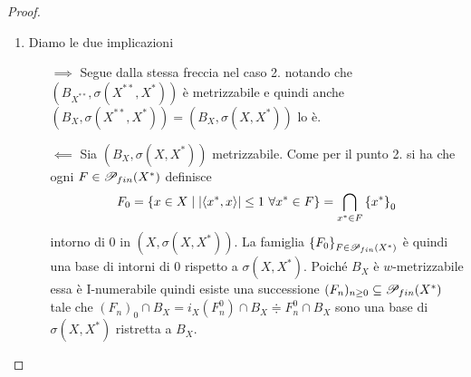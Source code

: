 \begin{proof}
\begin{enumerate}
\begin{itemize}
	Se $(B_{X^\ast},\sigma(X^\ast,X))$ \`e metrizzabile allora in particolare \`e I-numerabile, quindi esiste una successione $(F_n)_{n\geq 0}\subseteq \Ps_{fin}(X)$ tale che $(F_n^0\cap B_{X^\ast})_{n\geq 0}$ \`e una base di intorni di $0$. Notiamo in particolare che $\bigcap_{n\geq 0}F_n^0\cap B_{X^\ast}=(0)$.

	Senza perdita di generalit\`a supponiamo anche $F_{n+1}\supseteq 2F_n$ (se avevamo una successione valida basta aggiungere la riscalatura del termine prima e l'insieme resta finito). Ricordiamo che se $A\subseteq B$ allora $B^0\subseteq A^0$, quindi gli intorni che prendiamo diventano inscatolati.
	\begin{align*}
		(0)=&\bigcap_{n\geq 0}(F_n^0\cap B_{X^\ast})=\pa{\bigcap_{n\geq 0}F_n^0}\cap B_{X^\ast}=\pa{\bigcup_{n\geq 0} F_n}^0\cap B_{X^\ast}=\\
		=&\pa{\assco\pa{\bigcup_{n\geq 0} F_n}}^0\cap B_{X^\ast}\overset{(\star)}=\pa{\Span\pa{\bigcup_{n\geq 0}F_n}}^0\cap B_{X^\ast}=\\
		=&\pa{\Span\pa{\bigcup_{n\geq0}F_n}}^\perp\cap B_{X^\ast}
	\end{align*}
	dove l'uguaglianza $(\star)$ vale perch\'e per ipotesi $2\bigcup F_n\subseteq \bigcup F_n$, quindi prendendo l'inviluppo assolutamente convesso troviamo esattamente lo $\Span$ lineare:
	se $\sum \la_i s_i\in \Span\pa{\bigcup_{n\geq0}F_n}$ allora
	\[\sum \la_i s_i=\sum \frac{\la_i}{2^N} (2^N s_i)\in \assco\pa{\bigcup_{n\geq 0} F_n}\quad\text{ per $N$ tale che }\sum \frac{\abs{\la_i}}{2^N}\leq 1.\]
	Dunque, poich\'e $\pa{\Span\pa{\bigcup_{n\geq0}F_n}}^\perp\cap B_{X^\ast}=(0)$ e $B_{X^\ast}$ \`e una palla, 
	\[\pa{\Span\pa{\bigcup_{n\geq0}F_n}}^\perp=(0),\]
	cio\`e $\Span\pa{\bigcup_{n\geq0}F_n}$ \`e denso in $X$ (per $\normd$). Quindi $X$ \`e $\normd$-separabile se consideriamo $\Span_\Q\pa{\bigcup_{n\geq0}F_n}$ ($\bigcup_{n\geq0}F_n$ \`e numerabile perch\'e unione numerabile di finiti).
	\end{itemize}
	\setlength{\leftmargini}{0.5cm}
	\item Diamo le due implicazioni
	\setlength{\leftmargini}{0cm}
	\begin{itemize}
	\item[$\boxed{\implies}$] Segue dalla stessa freccia nel caso 2. notando che $(B_{X^{\ast\ast}},\sigma(X^{\ast\ast},X^\ast))$ \`e metrizzabile e quindi anche $(B_{X},\sigma(X^{\ast\ast},X^\ast))=(B_{X},\sigma(X,X^\ast))$ lo \`e.
	\item[$\boxed{\impliedby}$] Sia $(B_X,\sigma(X,X^\ast))$ metrizzabile. Come per il punto 2. si ha che ogni $F\in \mathscr{P}_{fin}(X^\ast)$ definisce
	\[F_0=\cpa{x\in X\mid \abs{\ps{x^\ast,x}}\leq 1\ \forall x^\ast\in F}=\bigcap_{x^\ast\in F}\cpa{x^\ast}_0\]
	intorno di $0$ in $(X,\sigma(X,X^\ast))$. La famiglia $\left\{{F_0}\right\}_{F\in\mathscr{P}_{fin}(X^\ast)}$ \`e quindi una base di intorni di $0$ rispetto a $\sigma(X,X^\ast)$. Poich\'e $B_X$ \`e $w$-metrizzabile essa \`e I-numerabile quindi esiste una successione $(F_n)_{n\geq 0}\subseteq \mathscr{P}_{fin}(X^\ast)$ tale che $(F_n)_0\cap B_X=i_X(F_n^0)\cap B_X\doteqdot F_n^0\cap B_X$ sono una base di $\sigma(X,X^\ast)$ ristretta a $B_X$.


\end{itemize}
\end{enumerate}
\end{proof}
